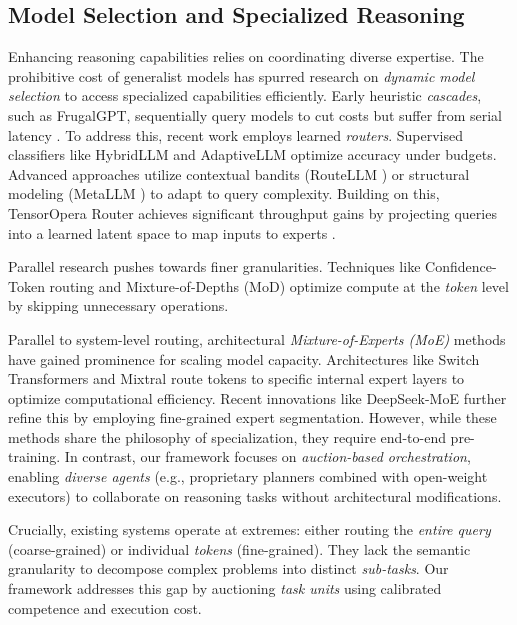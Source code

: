 \documentclass[11pt]{article}
\begin{document}
\subsection{Model Selection and Specialized Reasoning}
Enhancing reasoning capabilities relies on coordinating diverse expertise. 
The prohibitive cost of generalist models has spurred research on \emph{dynamic model selection} to access specialized capabilities efficiently.
Early heuristic \emph{cascades}, such as FrugalGPT, sequentially query models to cut costs but suffer from serial latency \citep{chen2023frugalgptuselargelanguage}. 
To address this, recent work employs learned \emph{routers}. Supervised classifiers like HybridLLM \citep{ding2024hybridllmcostefficientqualityaware} and AdaptiveLLM \citep{cheng2025adaptivellm} optimize accuracy under budgets.
Advanced approaches utilize contextual bandits (RouteLLM \citep{ong2025routellmlearningroutellms}) or structural modeling (MetaLLM \citep{nguyen2025metallmhighperformantcostefficientdynamic}) to adapt to query complexity. 
Building on this, TensorOpera Router achieves significant throughput gains by projecting queries into a learned latent space to map inputs to experts \citep{stripelis2024tensoroperaroutermultimodelrouter}.

Parallel research pushes towards finer granularities. Techniques like Confidence-Token routing \citep{chuang2025learningroutellmsconfidence} and Mixture-of-Depths (MoD) \citep{raposo2024mixtureofdepthsdynamicallyallocatingcompute} optimize compute at the \emph{token} level by skipping unnecessary operations. 

Parallel to system-level routing, architectural \emph{Mixture-of-Experts (MoE)} methods have gained prominence for scaling model capacity. Architectures like Switch Transformers \citep{fedus2022switchtransformersscalingtrillion} and Mixtral \citep{jiang2024mixtralexperts} route tokens to specific internal expert layers to optimize computational efficiency. Recent innovations like DeepSeek-MoE \citep{dai2024deepseekmoeultimateexpertspecialization} further refine this by employing fine-grained expert segmentation. 
However, while these methods share the philosophy of specialization, they require end-to-end pre-training. 
In contrast, our framework focuses on \emph{auction-based orchestration}, enabling \emph{diverse agents} (e.g., proprietary planners combined with open-weight executors) to collaborate on reasoning tasks without architectural modifications.

Crucially, existing systems operate at extremes: either routing the \emph{entire query} (coarse-grained) or individual \emph{tokens} (fine-grained). 
They lack the semantic granularity to decompose complex problems into distinct \emph{sub-tasks}. 
Our framework addresses this gap by auctioning \emph{task units} using calibrated competence and execution cost.
\end{document}
